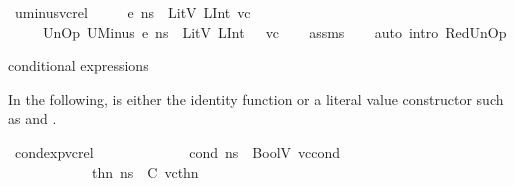 \begin{isabellebody}
\endisatagproof
{\isafoldproof}%
%
\isadelimproof
\isanewline
%
\endisadelimproof
\isanewline
{}\isamarkupfalse%
\ uminus{\isacharunderscore}{\kern0pt}vc{\isacharunderscore}{\kern0pt}rel{\isacharcolon}{\kern0pt}\isanewline
\ \ \ {\isachardoublequoteopen}{\isasymLambda}{\isacharcomma}{\kern0pt}{\isasymGamma}{\isacharcomma}{\kern0pt}{\isasymOmega}\ {\isasymturnstile}\ {\isasymlangle}e{\isacharcomma}{\kern0pt}\ ns{\isasymrangle}\ {\isasymDown}\ LitV\ {\isacharparenleft}{\kern0pt}LInt\ vc{\isacharparenright}{\kern0pt}{\isachardoublequoteclose}\isanewline
\ \ \ {\isachardoublequoteopen}{\isasymLambda}{\isacharcomma}{\kern0pt}{\isasymGamma}{\isacharcomma}{\kern0pt}{\isasymOmega}\ {\isasymturnstile}\ {\isasymlangle}UnOp\ UMinus\ e{\isacharcomma}{\kern0pt}\ ns{\isasymrangle}\ {\isasymDown}\ LitV\ {\isacharparenleft}{\kern0pt}LInt\ {\isacharparenleft}{\kern0pt}{}\ {\isacharminus}{\kern0pt}\ vc{\isacharparenright}{\kern0pt}{\isacharparenright}{\kern0pt}{\isachardoublequoteclose}\isanewline
%
\isadelimproof
\ \ %
\endisadelimproof
%
\isatagproof
{}\isamarkupfalse%
\ assms\isanewline
\ \ \isamarkupfalse%
\ {\isacharparenleft}{\kern0pt}auto\ intro{\isacharcolon}{\kern0pt}\ RedUnOp{\isacharparenright}{\kern0pt}%
\endisatagproof
{\isafoldproof}%
%
\isadelimproof
%
\endisadelimproof
%
\begin{isamarkuptext}%
conditional expressions%
\end{isamarkuptext}\isamarkuptrue%
%
\begin{isamarkuptext}%
In the following,  is either the identity function or a literal value constructor such 
as  and .%
\end{isamarkuptext}\isamarkuptrue%
\isamarkupfalse%
\ condexp{\isacharunderscore}{\kern0pt}vc{\isacharunderscore}{\kern0pt}rel{\isacharcolon}{\kern0pt}\ \ \ \ \ \ \ \ \isanewline
\ \ \ {\isachardoublequoteopen}{\isasymLambda}{\isacharcomma}{\kern0pt}{\isasymGamma}{\isacharcomma}{\kern0pt}{\isasymOmega}\ {\isasymturnstile}\ {\isasymlangle}cond{\isacharcomma}{\kern0pt}\ ns{\isasymrangle}\ {\isasymDown}\ BoolV\ vc{\isacharunderscore}{\kern0pt}cond{\isachardoublequoteclose}\ \ \isanewline
\ \ \ \ \ \ \ \ \ \ {\isachardoublequoteopen}{\isasymLambda}{\isacharcomma}{\kern0pt}{\isasymGamma}{\isacharcomma}{\kern0pt}{\isasymOmega}\ {\isasymturnstile}\ {\isasymlangle}thn{\isacharcomma}{\kern0pt}\ ns{\isasymrangle}\ {\isasymDown}\ C\ vc{\isacharunderscore}{\kern0pt}thn{\isachardoublequoteclose}\ \isanewline

\end{isabellebody}
